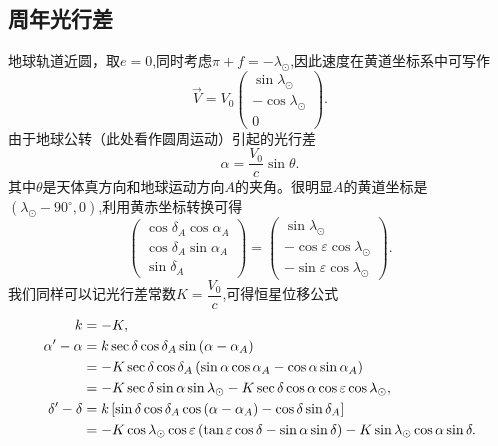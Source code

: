 \documentclass[11pt, a4paper, oneside]{ctexart}
\numberwithin{equation}{subsection}
\begin{document}
\subsection{周年光行差}
地球轨道近圆，取$e=0$,同时考虑$\pi+f=-\lambda_{\odot}$,因此速度在黄道坐标系中可写作
\begin{equation}
\vec{V}=V_{0}\begin{pmatrix}
\sin\lambda_{\odot}\\
-\cos\lambda_{\odot}\\
0
\end{pmatrix}.
\end{equation}
由于地球公转（此处看作圆周运动）引起的光行差
\begin{equation}
\alpha=\frac{V_{0}}{c}\sin\theta.
\end{equation}
其中$\theta$是天体真方向和地球运动方向$A$的夹角。很明显$A$的黄道坐标是$\left(\lambda_{\odot}-90^{\circ},0\right)$,利用黄赤坐标转换可得
\begin{equation}
\begin{pmatrix}
\cos\delta_A\cos\alpha_A\\
\cos\delta_A\sin\alpha_A\\
\sin\delta_A
\end{pmatrix}=\begin{pmatrix}
\sin\lambda_\odot\\
-\cos\varepsilon\cos\lambda_\odot\\
-\sin\varepsilon\cos\lambda_\odot
\end{pmatrix}.
\end{equation}
我们同样可以记光行差常数$K=\dfrac{V_{0}}{c}$,可得恒星位移公式
\begin{align}
k&=-K,\\
\alpha'-\alpha&=k\sec\delta\cos\delta_A\sin\left(\alpha-\alpha_A\right)\notag\\
&=-K\sec\delta\cos\delta_A\left(\sin\alpha\cos\alpha_A-\cos\alpha\sin\alpha_A\right)\notag\\
&=-K\sec\delta\sin\alpha\sin\lambda_\odot-K\sec\delta\cos\alpha\cos\varepsilon\cos\lambda_\odot,\\
\delta'-\delta&=k\left[\sin\delta\cos\delta_A\cos\left(\alpha-\alpha_A\right)-\cos\delta\sin\delta_A\right]\notag\\
&=-K\cos\lambda_\odot\cos\varepsilon\left(\tan\varepsilon\cos\delta-\sin\alpha\sin\delta\right)-K\sin\lambda_\odot\cos\alpha\sin\delta.
\end{align}
\end{document}
